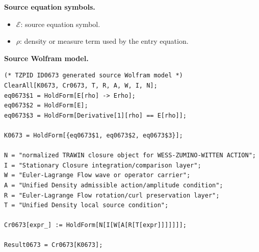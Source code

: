 \begin{minipage}[t]{0.49\linewidth}
\begingroup
\small
\raggedright
\textbf{Source equation symbols.}\par
\begin{itemize}[leftmargin=1.35em,itemsep=1pt,topsep=1pt,parsep=0pt]
    \item $\mathcal{E}$: source equation symbol.
    \item $\rho$: density or measure term used by the entry equation.
\end{itemize}
\endgroup
\end{minipage}\hfill
\begin{minipage}[t]{0.47\linewidth}
\begingroup
\scriptsize
\raggedright
\textbf{Source Wolfram model.}\par
\begin{Verbatim}[fontsize=\tiny,breaklines=true,breakanywhere=true]
(* TZPID ID0673 generated source Wolfram model *)
ClearAll[K0673, Cr0673, T, R, A, W, I, N];
eq0673$1 = HoldForm[E[rho] -> Erho];
eq0673$2 = HoldForm[E];
eq0673$3 = HoldForm[Derivative[1][rho] == E[rho]];

K0673 = HoldForm[{eq0673$1, eq0673$2, eq0673$3}];

N = "normalized TRAWIN closure object for WESS-ZUMINO-WITTEN ACTION";
I = "Stationary Closure integration/comparison layer";
W = "Euler-Lagrange Flow wave or operator carrier";
A = "Unified Density admissible action/amplitude condition";
R = "Euler-Lagrange Flow rotation/curl preservation layer";
T = "Unified Density local source condition";

Cr0673[expr_] := HoldForm[N[I[W[A[R[T[expr]]]]]]];

Result0673 = Cr0673[K0673];
\end{Verbatim}
\endgroup
\end{minipage}

